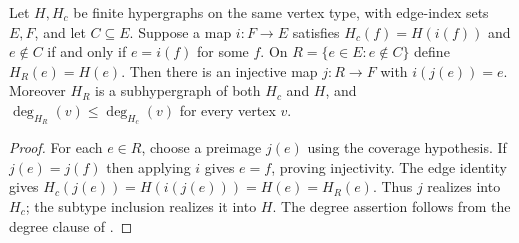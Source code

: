 \begin{lemma}
Let $H,H_c$ be finite hypergraphs on the same vertex type, with edge-index
sets $E,F$, and let $C\subseteq E$. Suppose a map $i:F\to E$ satisfies
$H_c(f)=H(i(f))$ and $e\notin C$ if and only if $e=i(f)$ for some $f$.
On $R=\{e\in E:e\notin C\}$ define $H_R(e)=H(e)$.
Then there is an injective map $j:R\to F$ with $i(j(e))=e$.
Moreover $H_R$ is a subhypergraph of both $H_c$ and $H$, and
$\deg_{H_R}(v)\le\deg_{H_c}(v)$ for every vertex $v$.
\end{lemma}
\begin{proof}
For each $e\in R$, choose a preimage $j(e)$ using the coverage hypothesis.
If $j(e)=j(f)$ then applying $i$ gives $e=f$, proving injectivity.
The edge identity gives $H_c(j(e))=H(i(j(e)))=H(e)=H_R(e)$.
Thus $j$ realizes  into $H_c$; the subtype
inclusion realizes it into $H$. The degree assertion follows from the
degree clause of .
\end{proof}
